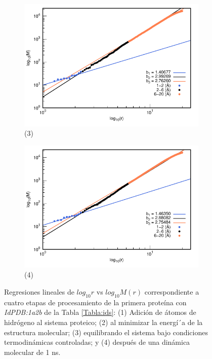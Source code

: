 \begin{figure}[H]
			\vspace{0cm} %
			
			\hspace{-0.3cm} 
			\begin{subfigure}{0.49\textwidth}
				\centering
				\includegraphics[width=\linewidth,page=1]{graphs/PDBs/1a2b/1a2bEq.pdf}
				\caption{(3)}
			\end{subfigure}
			\hspace{0.2cm}
			\begin{subfigure}{0.49\textwidth} %
				\centering
				\includegraphics[width=\linewidth,page=1]{graphs/PDBs/1a2b/1a2b1ns.pdf}
				\caption{(4)}
			\end{subfigure}
			
			\caption{
				Regresiones lineales de $log_{10}r$ vs $log_{10}M(r)$ correspondiente a cuatro etapas de procesamiento de la primera prote\'{i}na con \textit{IdPDB:1a2b} de la Tabla \ref{Tabla:ids}: (1) Adici\'{o}n de \'{a}tomos de hidr\'{o}geno al sistema proteico; (2) al minimizar la energ\'{i´}a de la estructura molecular; (3) equilibrando el sistema bajo condiciones termodin\'{a}micas controladas; y (4) despu\'{e}s de una din\'{a}mica molecular de 1 ns.}
			\label{fig:1a2b}
		\end{figure}
		
